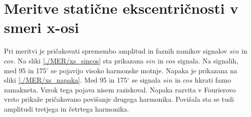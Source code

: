 \section{Meritve statične ekscentričnosti v smeri x-osi}
Pri meritvi je pričakovati spremembo amplitud in faznih zamikov signalov $sin$ in $cos$. Na sliki \ref{./MER/xs_sincos} sta prikazana $sin$ in $cos$ signala. Na signalih, med 95 in 175$^\circ$ se pojavijo visoko harmonske motnje.
Napaka je prikazana na sliki \ref{./MER/xs_napaka}. Med 95 in 175$^\circ$ se signala $sin$ in $cos$ hkrati fazno zamakneta. Vzrok tega pojava nisem raziskoval. Napaka razvita v Fourierovo vrsto prikaže pričakovano povišanje drugega harmonika. Povišala sta se tudi amplitudi tretjega in četrtega harmonika.
